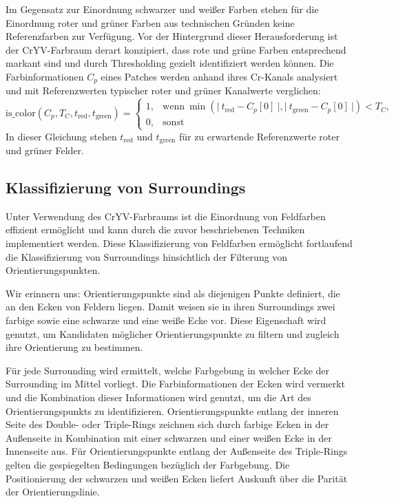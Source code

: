 Im Gegensatz zur Einordnung schwarzer und weißer Farben stehen für die Einordnung roter und grüner Farben aus technischen Gründen keine Referenzfarben zur Verfügung. Vor der Hintergrund dieser Herausforderung ist der CrYV-Farbraum derart konzipiert, dass rote und grüne Farben entsprechend markant sind und durch Thresholding gezielt identifiziert werden können. Die Farbinformationen $C_p$ eines Patches werden anhand ihres Cr-Kanals analysiert und mit Referenzwerten typischer roter und grüner Kanalwerte verglichen:
\begin{equation*}
    \text{is\_color}(C_p, T_C, t_\text{red}, t_\text{green}) =
    \begin{cases}
        1 , & \text{wenn} ~\min\left( \vert~ t_\text{red} - C_p[0] ~\vert, \vert~ t_\text{green} - C_p[0]~\vert \right) < T_C, \\
        0,  & \text{sonst}
    \end{cases}
\end{equation*}
In dieser Gleichung stehen $t_\text{red}$ und $t_\text{green}$ für zu erwartende Referenzwerte roter und grüner Felder.


\subsection{Klassifizierung von Surroundings}
\label{sec:surroundings_impl}

Unter Verwendung des CrYV-Farbraums ist die Einordnung von Feldfarben effizient ermöglicht und kann durch die zuvor beschriebenen Techniken implementiert werden. Diese Klassifizierung von Feldfarben ermöglicht fortlaufend die Klassifizierung von Surroundings hinsichtlich der Filterung von Orientierungspunkten.

Wir erinnern uns: Orientierungspunkte sind als diejenigen Punkte definiert, die an den Ecken von Feldern liegen. Damit weisen sie in ihren Surroundings zwei farbige sowie eine schwarze und eine weiße Ecke vor. Diese Eigenschaft wird genutzt, um Kandidaten möglicher Orientierungspunkte zu filtern und zugleich ihre Orientierung zu bestimmen.

Für jede Surrounding wird ermittelt, welche Farbgebung in welcher Ecke der Surrounding im Mittel vorliegt. Die Farbinformationen der Ecken wird vermerkt und die Kombination dieser Informationen wird genutzt, um die Art des Orientierungspunkts zu identifizieren. Orientierungspunkte entlang der inneren Seite des Double- oder Triple-Rings zeichnen sich durch farbige Ecken in der Außenseite in Kombination mit einer schwarzen und einer weißen Ecke in der Innenseite aus. Für Orientierungspunkte entlang der Außenseite des Triple-Rings gelten die gespiegelten Bedingungen bezüglich der Farbgebung. Die Positionierung der schwarzen und weißen Ecken liefert Auskunft über die Parität der Orientierungslinie.

